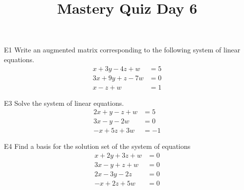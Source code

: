 \documentclass{sbgLAquiz}
\title{Mastery Quiz Day 6 }
\begin{document}
\begin{problem}{E1}
Write an augmented matrix corresponding to the following system of linear equations.
\begin{align*}
x+3y-4z +w &= 5 \\
3x+9y+z-7w &= 0 \\
x-z +w &= 1
\end{align*}
\end{problem}

\begin{problem}{E3}
Solve the system of linear equations.
\begin{align*}
2x+y-z+w &=5 \\
3x-y-2w &= 0 \\
-x+5z+3w&=-1
\end{align*}
\end{problem}
\newpage

\begin{problem}{E4}
Find a basis for the solution set of the system of equations
\begin{align*}
x+2y+3z+w &= 0 \\
3x-y+z+w &= 0 \\
2x-3y-2z &= 0 \\
-x+2z+5w &=0
\end{align*}
\end{problem}
\end{document}
